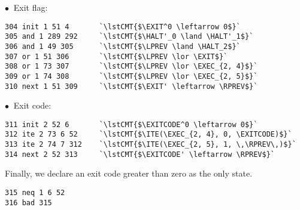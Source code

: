\noindent
$\bullet\ $ Exit flag:
\begin{lstlisting}[style=btor2]
304 init 1 51 4       `\lstCMT{$\EXIT^0 \leftarrow 0$}`
305 and 1 289 292     `\lstCMT{$\HALT'_0 \land \HALT'_1$}`
306 and 1 49 305      `\lstCMT{$\LPREV \land \HALT_2$}`
307 or 1 51 306       `\lstCMT{$\LPREV \lor \EXIT$}`
308 or 1 73 307       `\lstCMT{$\LPREV \lor \EXEC_{2, 4}$}`
309 or 1 74 308       `\lstCMT{$\LPREV \lor \EXEC_{2, 5}$}`
310 next 1 51 309     `\lstCMT{$\EXIT' \leftarrow \RPREV$}`
\end{lstlisting}

\noindent
$\bullet\ $ Exit code:
\begin{lstlisting}[style=btor2]
311 init 2 52 6       `\lstCMT{$\EXITCODE^0 \leftarrow 0$}`
312 ite 2 73 6 52     `\lstCMT{$\ITE(\EXEC_{2, 4}, 0, \EXITCODE)$}`
313 ite 2 74 7 312    `\lstCMT{$\ITE(\EXEC_{2, 5}, 1, \,\RPREV\,)$}`
314 next 2 52 313     `\lstCMT{$\EXITCODE' \leftarrow \RPREV$}`
\end{lstlisting}

\noindent
Finally, we declare an exit code greater than zero as the only  state.
\begin{lstlisting}[style=btor2]
315 neq 1 6 52
316 bad 315
\end{lstlisting}

%
%
%
%
%
%
%
%
%
%
%
%
%
%
%
%
%
%
%

